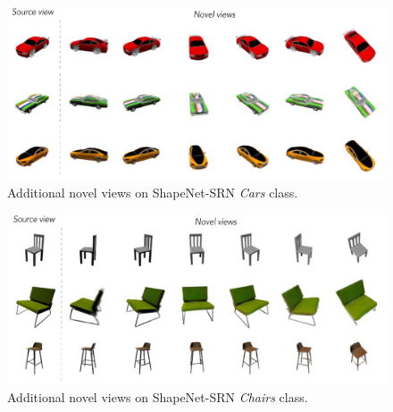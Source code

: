 \begin{figure}[htp!]
    \center
  \includegraphics[width=\linewidth]{images/epinerf/supp_NVScars.png}
  \caption{Additional novel views on ShapeNet-SRN \textit{Cars} class. }
  \label{fig:supp_NVScars}
\end{figure}


\begin{figure}[htp!]
    \center
  \includegraphics[width=\linewidth]{images/epinerf/supp_NVSchairs.png}
  \caption{Additional novel views on ShapeNet-SRN \textit{Chairs} class.}
  \label{fig:supp_NVSchairs}
\end{figure}

